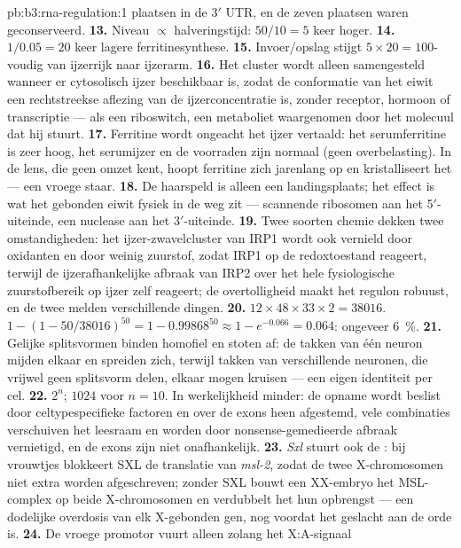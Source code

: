 \begin{solution}{pb:b3:rna-regulation:1}
plaatsen in de 3$'$ UTR, en de zeven plaatsen waren geconserveerd.
\textbf{13.} Niveau $\propto$ halveringstijd: $50/10 = 5$ keer hoger.
\textbf{14.} $1/0.05 = 20$ keer lagere ferritinesynthese.
\textbf{15.} Invoer/opslag stijgt $5\times 20 = 100$-voudig van ijzerrijk
naar ijzerarm.
\textbf{16.} Het cluster wordt alleen samengesteld wanneer er cytosolisch
ijzer beschikbaar is, zodat de conformatie van het eiwit een
rechtstreekse aflezing van de ijzerconcentratie is, zonder receptor,
hormoon of transcriptie --- als een riboswitch, een metaboliet
waargenomen door het molecuul dat hij stuurt.
\textbf{17.} Ferritine wordt ongeacht het ijzer vertaald: het
serumferritine is zeer hoog, het serumijzer en de voorraden zijn normaal
(geen overbelasting). In de lens, die geen omzet kent, hoopt ferritine
zich jarenlang op en kristalliseert het --- een vroege staar.
\textbf{18.} De haarspeld is alleen een landingsplaats; het effect is
wat het gebonden eiwit fysiek in de weg zit --- scannende ribosomen aan
het 5$'$-uiteinde, een nuclease aan het 3$'$-uiteinde.
\textbf{19.} Twee soorten chemie dekken twee omstandigheden: het
ijzer-zwavelcluster van IRP1 wordt ook vernield door oxidanten en door
weinig zuurstof, zodat IRP1 op de redoxtoestand reageert, terwijl de
ijzerafhankelijke afbraak van IRP2 over het hele fysiologische
zuurstofbereik op ijzer zelf reageert; de overtolligheid maakt het
regulon robuust, en de twee melden verschillende dingen.
\textbf{20.} $12\times 48\times 33\times 2 = \num{38016}$. $1 - (1 -
50/\num{38016})^{50} = 1 - 0.99868^{50} \approx 1 - e^{-0.066} =
0.064$: ongeveer \qty{6}{\%}.
\textbf{21.} Gelijke splitsvormen binden homofiel en stoten af: de
takken van één neuron mijden elkaar en spreiden zich, terwijl takken
van verschillende neuronen, die vrijwel geen splitsvorm delen, elkaar
mogen kruisen --- een eigen identiteit per cel.
\textbf{22.} $2^{n}$; $\num{1024}$ voor $n = 10$. In werkelijkheid
minder: de opname wordt beslist door celtypespecifieke factoren en over
de exons heen afgestemd, vele combinaties verschuiven het leesraam en
worden door nonsense-gemedieerde afbraak vernietigd, en de exons zijn
niet onafhankelijk.
\textbf{23.} \emph{Sxl} stuurt ook de : bij vrouwtjes
blokkeert SXL de translatie van \emph{msl-2}, zodat de twee
X-chromosomen niet extra worden afgeschreven; zonder SXL bouwt een
XX-embryo het MSL-complex op beide X-chromosomen en verdubbelt het hun
opbrengst --- een dodelijke overdosis van elk X-gebonden gen, nog
voordat het geslacht aan de orde is.
\textbf{24.} De vroege promotor vuurt alleen zolang het X:A-signaal

\end{solution}
